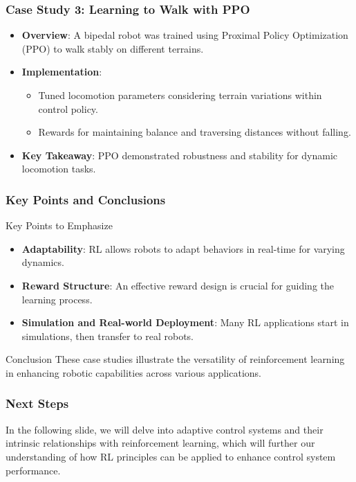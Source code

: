 \documentclass[aspectratio=169]{beamer}
\begin{document}
\begin{frame}[fragile]
    \frametitle{Case Study 3: Learning to Walk with PPO}
    \begin{itemize}
        \item \textbf{Overview}: A bipedal robot was trained using Proximal Policy Optimization (PPO) to walk stably on different terrains.
        \item \textbf{Implementation}:
        \begin{itemize}
            \item Tuned locomotion parameters considering terrain variations within control policy.
            \item Rewards for maintaining balance and traversing distances without falling.
        \end{itemize}
        \item \textbf{Key Takeaway}: PPO demonstrated robustness and stability for dynamic locomotion tasks.
    \end{itemize}
\end{frame}

\begin{frame}[fragile]
    \frametitle{Key Points and Conclusions}
    \begin{block}{Key Points to Emphasize}
        \begin{itemize}
            \item \textbf{Adaptability}: RL allows robots to adapt behaviors in real-time for varying dynamics.
            \item \textbf{Reward Structure}: An effective reward design is crucial for guiding the learning process.
            \item \textbf{Simulation and Real-world Deployment}: Many RL applications start in simulations, then transfer to real robots.
        \end{itemize}
    \end{block}
    \begin{block}{Conclusion}
        These case studies illustrate the versatility of reinforcement learning in enhancing robotic capabilities across various applications.
    \end{block}
\end{frame}

\begin{frame}[fragile]
    \frametitle{Next Steps}
    In the following slide, we will delve into adaptive control systems and their intrinsic relationships with reinforcement learning, which will further our understanding of how RL principles can be applied to enhance control system performance.
\end{frame}
\end{document}
